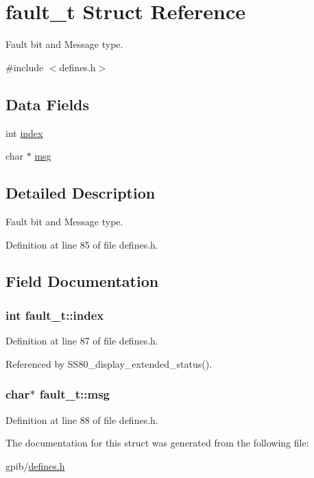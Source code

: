 \hypertarget{structfault__t}{}\section{fault\+\_\+t Struct Reference}
\label{structfault__t}


Fault bit and Message type.  




{\ttfamily \#include $<$defines.\+h$>$}

\subsection*{Data Fields}
\begin{DoxyCompactItemize}
\item 
int \hyperlink{structfault__t_a540c9496df912b65e22c50b6a40535ef}{index}
\item 
char $\ast$ \hyperlink{structfault__t_a9037306efc26edf60b59bc1ee6843c69}{msg}
\end{DoxyCompactItemize}


\subsection{Detailed Description}
Fault bit and Message type. 

Definition at line 85 of file defines.\+h.



\subsection{Field Documentation}
\subsubsection[{\texorpdfstring{index}{index}}]{\setlength{\rightskip}{0pt plus 5cm}int fault\+\_\+t\+::index}\hypertarget{structfault__t_a540c9496df912b65e22c50b6a40535ef}{}\label{structfault__t_a540c9496df912b65e22c50b6a40535ef}


Definition at line 87 of file defines.\+h.



Referenced by S\+S80\+\_\+display\+\_\+extended\+\_\+status().

\subsubsection[{\texorpdfstring{msg}{msg}}]{\setlength{\rightskip}{0pt plus 5cm}char$\ast$ fault\+\_\+t\+::msg}\hypertarget{structfault__t_a9037306efc26edf60b59bc1ee6843c69}{}\label{structfault__t_a9037306efc26edf60b59bc1ee6843c69}


Definition at line 88 of file defines.\+h.



The documentation for this struct was generated from the following file\+:\begin{DoxyCompactItemize}
\item 
gpib/\hyperlink{defines_8h}{defines.\+h}\end{DoxyCompactItemize}
